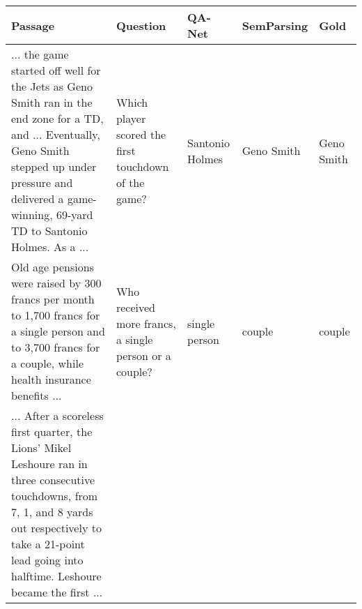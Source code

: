 \begin{table*}[t]
\centering
\footnotesize
\begin{tabular}{p{7cm}p{2.8cm}p{1.5cm}p{1.5cm}p{1.5cm}}
\toprule
{\bf Passage} & {\bf Question} & {\bf QA-Net} & {\bf SemParsing} & {\bf Gold}\\
 \midrule
... the game started off well for the Jets as Geno Smith ran in the end zone for a TD, and ... Eventually, Geno Smith stepped up under pressure and delivered a game-winning, 69-yard TD to Santonio Holmes. As a ...  
 & Which player scored the first touchdown of the game? 
 & Santonio Holmes & Geno Smith & Geno Smith\\ 
 \midrule
Old age pensions were raised by 300 francs per month to 1,700 francs for a single person and to 3,700 francs for a couple, while health insurance benefits ...
 & Who received more francs, a single person or a couple? 
 & single person & couple & couple\\
 \midrule
... After a scoreless first quarter, the Lions' Mikel Leshoure ran in three consecutive touchdowns, from 7, 1, and 8 yards out respectively to take a 21-point lead going into halftime. Leshoure became the first ...

\end{tabular}
\end{table*}
